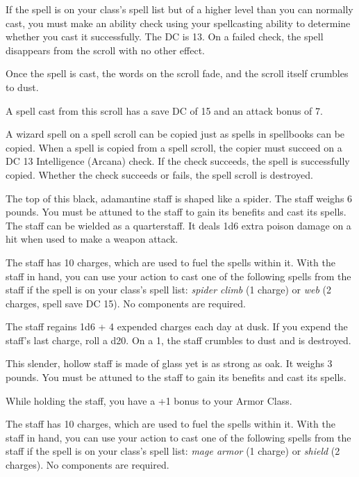 \documentclass[10pt,a4paper,twoside,bg=print,twocolumn,openany,nodeprecatedcode]{dndbook}
\begin{document}
If the spell is on your class's spell list but of a higher level than you can normally cast, you must make an ability check using your spellcasting ability to determine whether you cast it successfully. The DC is 13. On a failed check, the spell disappears from the scroll with no other effect.

Once the spell is cast, the words on the scroll fade, and the scroll itself crumbles to dust.

A spell cast from this scroll has a save DC of 15 and an attack bonus of 7.

A wizard spell on a spell scroll can be copied just as spells in spellbooks can be copied. When a spell is copied from a spell scroll, the copier must succeed on a DC 13 Intelligence (Arcana) check. If the check succeeds, the spell is successfully copied. Whether the check succeeds or fails, the spell scroll is destroyed.

The top of this black, adamantine staff is shaped like a spider. The staff weighs 6 pounds. You must be attuned to the staff to gain its benefits and cast its spells. The staff can be wielded as a quarterstaff. It deals 1d6 extra poison damage on a hit when used to make a weapon attack.

The staff has 10 charges, which are used to fuel the spells within it. With the staff in hand, you can use your action to cast one of the following spells from the staff if the spell is on your class's spell list: \textit{spider climb} (1 charge) or \textit{web} (2 charges, spell save DC 15). No components are required.

The staff regains 1d6 + 4 expended charges each day at dusk. If you expend the staff's last charge, roll a d20. On a 1, the staff crumbles to dust and is destroyed.

This slender, hollow staff is made of glass yet is as strong as oak. It weighs 3 pounds. You must be attuned to the staff to gain its benefits and cast its spells.

While holding the staff, you have a +1 bonus to your Armor Class.

The staff has 10 charges, which are used to fuel the spells within it. With the staff in hand, you can use your action to cast one of the following spells from the staff if the spell is on your class's spell list: \textit{mage armor} (1 charge) or \textit{shield} (2 charges). No components are required.
\end{document}
